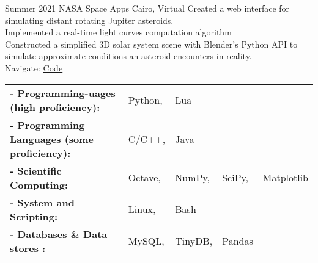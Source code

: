 \documentclass[hidelinks]{report}
\begin{document}
\entry
    {Summer 2021}
    {NASA Space Apps Cairo, \normalfont Virtual} 
    {}
    {
      \textbullet Created a web interface for simulating distant rotating Jupiter asteroids.\\
      \textbullet Implemented a real-time light curves computation algorithm \\
      \textbullet Constructed a simplified 3D solar system scene with Blender's Python API to simulate approximate conditions an asteroid encounters in reality. \\
      \textbullet Navigate: \href{\github/Asteroid-Bent}{\underline{Code}}
    }

\vspace{2mm}
    


\begin{tabular}{ l l l l l}
      \bf{- Programming-uages (high proficiency):} & Python, & Lua \\ 
      \bf{- Programming Languages (some proficiency):} & C/C++, & Java \\ 
      \bf{- Scientific Computing:} & Octave, & NumPy, & SciPy, & Matplotlib \\ 
      \bf{- System and Scripting:} & Linux, & Bash \\ 
      \bf{- Databases \& Data stores :} & MySQL, & TinyDB, & Pandas \\ 
       
\end{tabular}
\end{document}
